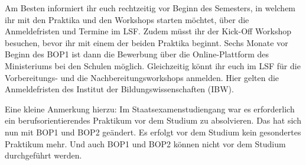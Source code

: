 Am Besten informiert ihr euch rechtzeitig vor Beginn des Semesters, in welchem ihr mit den Praktika und den Workshops starten möchtet, über die Anmeldefristen und Termine im LSF. Zudem müsst ihr der Kick-Off Workshop besuchen, bevor ihr mit einem der beiden Praktika beginnt. Sechs Monate vor Beginn des BOP1 ist dann die Bewerbung über die Online-Plattform des Ministeriums bei den Schulen möglich. Gleichzeitig könnt ihr euch im LSF für die Vorbereitungs- und die Nachbereitungsworkshops anmelden. Hier gelten die Anmeldefristen des  Institut der Bildungswissenschaften (IBW).

Eine kleine Anmerkung hierzu: Im Staatsexamenstudiengang war es erforderlich ein berufsorientierendes Praktikum vor dem Studium zu absolvieren. Das hat sich nun mit BOP1 und BOP2 geändert. Es erfolgt vor dem Studium kein gesondertes Praktikum mehr. Und auch BOP1 und BOP2 können nicht vor dem Studium durchgeführt werden.

